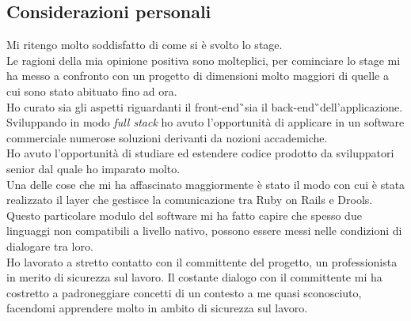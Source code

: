 \subsection{Considerazioni personali}
	Mi ritengo molto soddisfatto di come si è svolto lo stage.\\
	Le ragioni della mia opinione positiva sono molteplici, per cominciare lo stage mi ha messo a confronto con un progetto di dimensioni molto maggiori di quelle a cui sono stato abituato fino ad ora. \\
	Ho curato sia gli aspetti riguardanti il \gls{front-end}\G\ sia il \gls{back-end}\G\ dell'applicazione. Sviluppando in modo  \textit{full stack} ho avuto l'opportunità di applicare in un software commerciale numerose soluzioni derivanti da nozioni accademiche. \\
	Ho avuto l'opportunità di studiare ed estendere codice prodotto da sviluppatori senior dal quale ho imparato molto.\\
	Una delle cose che mi ha affascinato maggiormente è stato il modo con cui è stata realizzato il layer che gestisce la comunicazione tra  Ruby on Rails e Drools. Questo particolare modulo del software mi ha fatto capire che spesso due linguaggi non compatibili a livello nativo, possono essere messi nelle condizioni di dialogare tra loro. \\
	Ho lavorato a stretto contatto con il committente del progetto, un professionista in merito di sicurezza sul lavoro. Il costante dialogo con il committente mi ha costretto a padroneggiare concetti di un contesto a me quasi sconosciuto, facendomi apprendere molto in ambito di sicurezza sul lavoro.